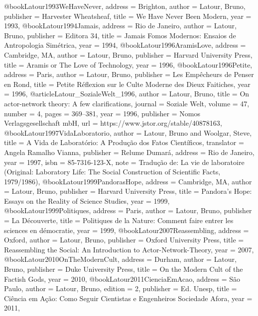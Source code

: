 @book{Latour1993WeHaveNever,
  address   = {Brighton},
  author    = {Latour, Bruno},
  publisher = {Harvester Wheatsheaf},
  title     = {{We Have Never Been Modern}},
  year      = {1993},
}
@book{Latour1994Jamais,
  address   = {Rio de Janeiro},
  author    = {Latour, Bruno},
  publisher = {Editora 34},
  title     = {{Jamais Fomos Modernos: Ensaios de Antropologia Simétrica}},
  year      = {1994},
}
@book{Latour1996AramisLove,
  address   = {Cambridge, MA},
  author    = {Latour, Bruno},
  publisher = {Harvard University Press},
  title     = {{Aramis or The Love of Technology}},
  year      = {1996},
}
@book{Latour1996Petite,
  address   = {Paris},
  author    = {Latour, Bruno},
  publisher = {Les Empêcheurs de Penser en Rond},
  title     = {{Petite Réflexion sur le Culte Moderne des Dieux Faitiches}},
  year      = {1996},
}
@article{Latour_SozialeWelt_1996,
  author  = {Latour, Bruno},
  title   = {On actor-network theory: A few clarifications},
  journal = {Soziale Welt},
  volume  = {47},
  number  = {4},
  pages   = {369--381},
  year    = {1996},
  publisher = {Nomos Verlagsgesellschaft mbH},
  url     = {https://www.jstor.org/stable/40878163},
}
@book{Latour1997VidaLaboratorio,
  author    = {Latour, Bruno and Woolgar, Steve},
  title     = {{A Vida de Laboratório: A Produção dos Fatos Científicos}},
  translator = {Angela Ramalho Vianna},
  publisher = {Relume Dumará},
  address   = {Rio de Janeiro},
  year      = {1997},
  isbn      = {85-7316-123-X},
  note      = {Tradução de: La vie de laboratoire (Original: Laboratory Life: The Social Construction of Scientific Facts, 1979/1986)},
}
@book{Latour1999PandorasHope,
  address   = {Cambridge, MA},
  author    = {Latour, Bruno},
  publisher = {Harvard University Press},
  title     = {{Pandora's Hope: Essays on the Reality of Science Studies}},
  year      = {1999},
}
@book{Latour1999Politiques,
  address   = {Paris},
  author    = {Latour, Bruno},
  publisher = {La Découverte},
  title     = {{Politiques de la Nature: Comment faire entrer les sciences en démocratie}},
  year      = {1999},
}
@book{Latour2007Reassembling,
  address   = {Oxford},
  author    = {Latour, Bruno},
  publisher = {Oxford University Press},
  title     = {{Reassembling the Social: An Introduction to Actor-Network-Theory}},
  year      = {2007},
}
@book{Latour2010OnTheModernCult,
  address   = {Durham},
  author    = {Latour, Bruno},
  publisher = {Duke University Press},
  title     = {{On the Modern Cult of the Factish Gods}},
  year      = {2010},
}
@book{Latour2011CienciaEmAcao,
  address   = {São Paulo},
  author    = {Latour, Bruno},
  edition   = {2},
  publisher = {Ed. Unesp},
  title     = {{Ciência em Ação: Como Seguir Cientistas e Engenheiros Sociedade Afora}},
  year      = {2011},
}
